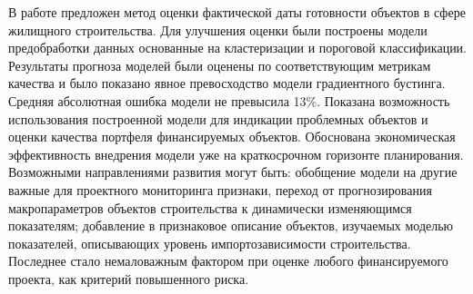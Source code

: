 \documentclass[12pt,a4paper]{article} %
\begin{document}
В работе предложен метод оценки фактической даты готовности объектов в сфере жилищного строительства. Для улучшения оценки были построены модели предобработки данных основанные на кластеризации и пороговой классификации. Результаты прогноза моделей были оценены по соответствующим метрикам качества и было показано явное превосходство модели градиентного бустинга. Средняя абсолютная ошибка модели не превысила 13\%. Показана возможность использования построенной модели для индикации проблемных объектов и оценки качества портфеля финансируемых объектов. Обоснована экономическая эффективность внедрения модели уже на краткосрочном горизонте планирования. Возможными направлениями развития могут быть: обобщение модели на другие важные для проектного мониторинга признаки, переход от прогнозирования макропараметров объектов строительства к динамически изменяющимся показателям; добавление в признаковое описание объектов, изучаемых моделью показателей, описывающих уровень импортозависимости строительства. Последнее стало немаловажным фактором при оценке любого финансируемого проекта, как критерий повышенного риска.



\newpage



\nocite{ Nikon, Antonov2014}
\nocite{GV, Daugman, Daugman2, Daugman4, Adam_1, Adam_2, Matv, Min, Wildes, KKX, Masek, KP, Yang, Smirn, Medic, Tech, Terr, Conf3, Canny, Inter, Radon, Hough_Parab}
\end{document}
